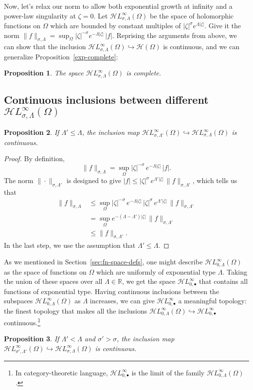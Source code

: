 \documentclass{article}
\theoremstyle{plain}
\newtheorem{prop}{Proposition}
\newcommand{\R}{\mathbb{R}}
\newcommand{\holo}{\mathcal{H}}
\newcommand{\singexp}[2]{\mathcal{H}L^\infty_{#1, #2}}
\newcommand{\singexpalg}[1]{\singexp{#1}{\bullet}}
\newcommand{\domain}{\Omega}
\begin{document}
Now, let's relax our norm to allow both exponential growth at infinity and a power-law singularity at $\zeta = 0$. Let $\singexp{\sigma}{\Lambda}(\Omega)$ be the space of holomorphic functions on $\Omega$ which are bounded by constant multiples of $|\zeta|^\sigma e^{\Lambda|\zeta|}$. Give it the norm $\|f\|_{\sigma,\Lambda} = \sup_\Omega |\zeta|^{-\sigma} e^{-\Lambda|\zeta|}\,|f|$. Reprising the arguments from above, we can show that the inclusion $\singexp{\sigma}{\Lambda}(\Omega) \hookrightarrow \holo(\Omega)$ is continuous, and we can generalize Proposition~\ref{exp-complete}:
\begin{prop}
The space $\singexp{\sigma}{\Lambda}(\Omega)$ is complete.
\end{prop}

\subsection{Continuous inclusions between different $\singexp{\sigma}{\Lambda}(\Omega)$}\label{sec:inclusions}
\begin{prop}\label{prop:exp-inclus}
If $\Lambda'\leq\Lambda$, the inclusion map $\singexp{\sigma}{\Lambda'}(\Omega)\hookrightarrow \singexp{\sigma}{\Lambda}(\Omega)$ is continuous.
\end{prop}
\begin{proof}
By definition,
\[ \|f\|_{\sigma,\Lambda}=\sup_{\Omega} |\zeta|^{-\sigma}\,e^{-\Lambda |\zeta|}\, |f|. \]
The norm $\|\cdot\|_{\sigma, \Lambda'}$ is designed to give $|f| \le |\zeta|^\sigma\,e^{\Lambda'|\zeta|}\,\|f\|_{\sigma, \Lambda'}$, which tells us that
\begin{align*}
\|f\|_{\sigma,\Lambda} & \leq \sup_{\Omega} |\zeta|^{-\sigma}\,e^{-\Lambda |\zeta|}\,|\zeta|^\sigma\,e^{\Lambda'|\zeta|}\,\|f\|_{\sigma, \Lambda'}\\
&=\sup_{\Omega} e^{-(\Lambda-\Lambda') |\zeta|}\,\|f\|_{\sigma, \Lambda'}\\
&\leq \|f\|_{\sigma,\Lambda'}.
\end{align*}
In the last step, we use the assumption that $\Lambda' \le \Lambda$.
\end{proof}
As we mentioned in Section~\ref{sec:fn-space-defs}, one might describe $\singexp{0}{\Lambda}(\domain)$ as the space of functions on $\domain$ which are uniformly of exponential type $\Lambda$. Taking the union of these spaces over all $\Lambda \in \R$, we get the space $\singexpalg{0}$ that contains all functions of exponential type. Having continuous inclusions between the subspaces $\singexp{0}{\Lambda}(\domain)$ as $\Lambda$ increases, we can give $\singexpalg{0}$ a meaningful topology: the finest topology that makes all the inclusions $\singexp{0}{\Lambda}(\domain) \hookrightarrow \singexpalg{0}$ continuous.\footnote{In category-theoretic language, $\singexpalg{0}$ is the limit of the family $\singexp{0}{\Lambda}(\domain)$.}
\begin{prop}
    If $\Lambda'<\Lambda$ and $\sigma'>\sigma$, the inclusion map $\singexp{\sigma'}{\Lambda'}(\Omega)\hookrightarrow \singexp{\sigma}{\Lambda}(\Omega)$ is continuous.
\end{prop}
\end{document}
